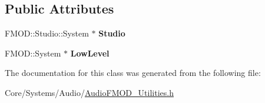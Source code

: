\subsection*{Public Attributes}
\begin{DoxyCompactItemize}
\item 
\hypertarget{classDCEngine_1_1Systems_1_1FMODSystemPtr_adab6c3b41ab96a76d04067f563dfe870}{F\-M\-O\-D\-::\-Studio\-::\-System $\ast$ {\bfseries Studio}}\label{classDCEngine_1_1Systems_1_1FMODSystemPtr_adab6c3b41ab96a76d04067f563dfe870}

\item 
\hypertarget{classDCEngine_1_1Systems_1_1FMODSystemPtr_a7d5a67766179789be1d6127aad6b9625}{F\-M\-O\-D\-::\-System $\ast$ {\bfseries Low\-Level}}\label{classDCEngine_1_1Systems_1_1FMODSystemPtr_a7d5a67766179789be1d6127aad6b9625}

\end{DoxyCompactItemize}


The documentation for this class was generated from the following file\-:\begin{DoxyCompactItemize}
\item 
Core/\-Systems/\-Audio/\hyperlink{AudioFMOD__Utilities_8h}{Audio\-F\-M\-O\-D\-\_\-\-Utilities.\-h}\end{DoxyCompactItemize}
